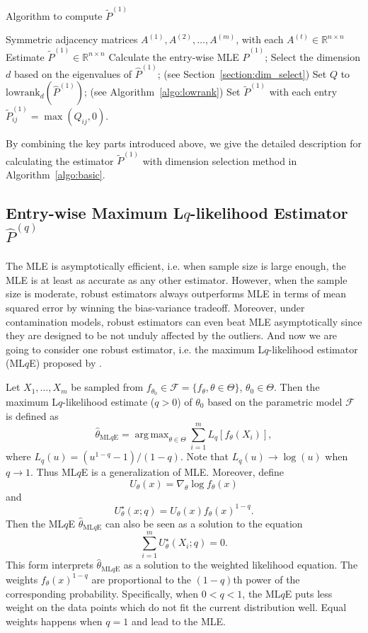 \documentclass[a4paper]{article}
\DeclareMathOperator*{\argmax}{arg\,max}
\renewcommand{\hat}{\widehat}
\begin{document}
\begin{algorithm}[H]
\caption{Algorithm to compute $\widetilde{P}^{(1)}$}
\label{algo:basic}
\begin{algorithmic}[1]
\REQUIRE Symmetric adjacency matrices $A^{(1)}, A^{(2)}, \dotsc, A^{(m)}$, with each $A^{(t)} \in \mathbb{R}^{n \times n}$
\ENSURE Estimate $\widetilde{P}^{(1)} \in \mathbb{R}^{n \times n}$
\STATE Calculate the entry-wise MLE $\hat{P}^{(1)}$;
\STATE Select the dimension $d$ based on the eigenvalues of $\hat{P}^{(1)}$; (see Section~\ref{section:dim_select})
\STATE Set $Q$ to $\mathrm{lowrank}_d(\hat{P}^{(1)})$; (see Algorithm~\ref{algo:lowrank})
\STATE Set $\widetilde{P}^{(1)}$ with each entry $\widetilde{P}^{(1)}_{ij} = \max(Q_{ij}, 0)$.
\end{algorithmic}
\end{algorithm}


By combining the key parts introduced above, we give the detailed description for calculating the estimator $\widetilde{P}^{(1)}$ with dimension selection method in Algorithm~\ref{algo:basic}.




\subsection{Entry-wise Maximum L$q$-likelihood Estimator $\hat{P}^{(q)}$}

The MLE is asymptotically efficient, i.e. when sample size is large enough, the MLE is at least as accurate as any other estimator. However, when the sample size is moderate, robust estimators always outperforms MLE in terms of mean squared error by winning the bias-variance tradeoff. Moreover, under contamination models, robust estimators can even beat MLE asymptotically since they are designed to be not unduly affected by the outliers. And now we are going to consider one robust estimator, i.e. the maximum L$q$-likelihood estimator (ML$q$E) proposed by \citet{ferrari2010}.

Let $X_1, \dotsc, X_m$ be sampled from $f_{\theta_0} \in \mathcal{F} = \{ f_{\theta}, \theta \in \Theta \}$, $\theta_0 \in \Theta$. Then the maximum L$q$-likelihood estimate ($q > 0$) of $\theta_0$ based on the parametric model $\mathcal{F}$ is defined as
\[
	\hat{\theta}_{\mathrm{ML}q\mathrm{E}} = \argmax_{\theta \in \Theta} \sum_{i=1}^m L_q[f_{\theta}(X_i)],
\]
where $L_q(u) = (u^{1-q} - 1)/(1- q)$.
Note that $L_q(u) \to \log(u)$ when $q \to 1$. Thus ML$q$E is a generalization of MLE.
Moreover, define
\[
	U_{\theta}(x) = \nabla_{\theta} \log f_{\theta}(x)
\]
and
\[
	U^{\star}_{\theta}(x; q) = U_{\theta}(x) f_{\theta}(x)^{1-q}.
\]
Then the ML$q$E $\hat{\theta}_{\mathrm{ML}q\mathrm{E}}$ can also be seen as a solution to the equation
\[
	\sum_{i=1}^m U^{\star}_{\theta}(X_i; q) = 0.
\]
This form interprets $\hat{\theta}_{\mathrm{ML}q\mathrm{E}}$ as a solution to the weighted likelihood equation. The weights $f_{\theta}(x)^{1-q}$ are proportional to the $(1-q)$th power of the corresponding probability. Specifically, when $0 < q < 1$, the ML$q$E puts less weight on the data points which do not fit the current distribution well. Equal weights happens when $q=1$ and lead to the MLE.
\end{document}
